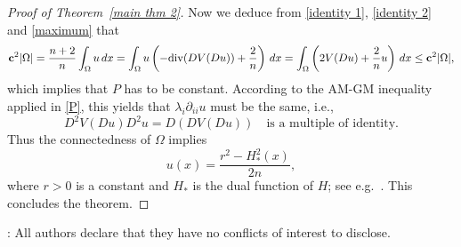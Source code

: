 \documentclass[reqno,11pt]{amsart}
\makeatletter
\def\ez{\epsilon}
\newtheorem{lem}[thm]{Lemma}%
\numberwithin{equation}{section}
\theoremstyle{remark}
\makeatother
\begin{document}
\begin{proof}[Proof of Theorem~\ref{main thm 2}]

Now we deduce from \eqref{identity 1}, \eqref{identity 2} and \eqref{maximum} that
\begin{align*}
   \mathbf{c}^2|\Omega|   = \frac{n+2}{n} \int_{\Omega} u\,dx =   \int_{\Omega} u\left(-{\rm div}(DV(Du))+\frac{2}{n}\right)\,dx=\int_{\Omega} \left(2V(Du)+\frac{2}{n} u \right)\,dx\le \mathbf{c}^2|\Omega|,
\end{align*}
which implies that $P$ has to be constant. According to the AM-GM inequality applied in \eqref{P}, this yields that  $\lambda_i\partial_{ii}u$  must be the same, i.e., 
$$D^2V(Du)D^2u=D(DV(Du)) \quad \text{is a multiple of identity.}$$
Thus the connectedness of $\Omega$ implies
$$u(x)=\frac{r^2-H_*^2(x)}{2n},$$
where  $r>0$ is a constant and  $H_*$ is the dual function of $H$; see e.g.\ \cite[(5.17)-(5.19)]{CS2009}. This concludes the theorem. 
\end{proof}

: All authors declare that they have no conflicts of interest to disclose.



\end{document}
